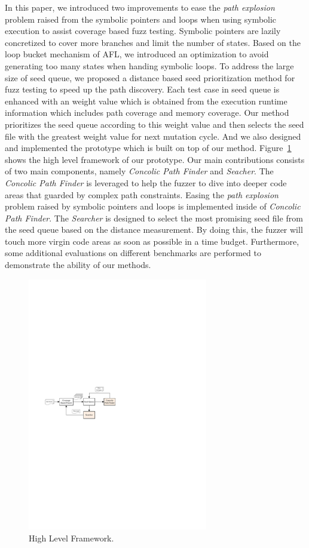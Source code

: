 In this paper, we introduced two improvements to ease the \textit{path explosion} problem raised from the symbolic pointers and loops when using symbolic execution to assist coverage based fuzz testing. 
Symbolic pointers are lazily concretized to cover more branches and limit the number of states. 
Based on the loop bucket mechanism of AFL, we introduced an optimization to avoid generating too many states when handing symbolic loops. 
To address the large size of seed queue, we proposed a distance based seed prioritization method for fuzz testing to speed up the path discovery. 
Each test case in seed queue is enhanced with an weight value which is obtained from the execution runtime information which includes path coverage and memory coverage.
Our method prioritizes the seed queue according to this weight value and then selects the seed file with the greatest weight value for next mutation cycle.
And we also designed and implemented the prototype which is built on top of our method. Figure~\ref{Framework} shows the high level framework of our prototype.
Our main contributions consists of two main components, namely \emph{Concolic Path Finder} and \emph{Seacher}. The \emph{Concolic Path Finder} is leveraged to help the fuzzer to dive into deeper code areas that guarded by complex path constraints. Easing the \textit{path explosion} problem raised by symbolic pointers and loops is implemented inside of \emph{Concolic Path Finder}. The \emph{Searcher} is designed to select the most promising seed file from the seed queue based on the distance measurement. By doing this, the fuzzer will touch more virgin code areas as soon as possible in a time budget. 
Furthermore, some additional evaluations on different benchmarks are performed to demonstrate the ability of our methods.
\begin{figure}
\centering
\includegraphics[width=0.7\textwidth]{figures/framework.pdf} 
\caption{High Level Framework.}\label{Framework}
\end{figure}

